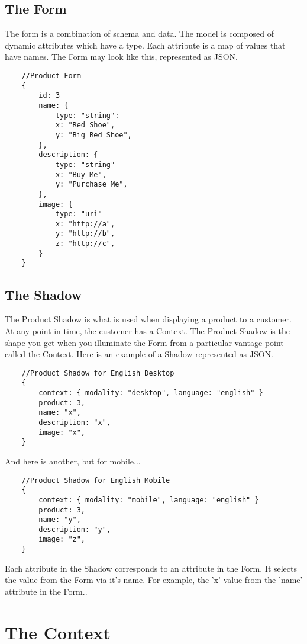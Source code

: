 \documentclass[11pt]{article}
\begin{document}
\newpage
\subsection{The Form}
The form is a combination of schema and data. The model is composed of dynamic
attributes which have a type. Each attribute is a map of values that have names.
The Form may look like this, represented as JSON.

\begin{lstlisting}
    //Product Form
    {
        id: 3
        name: { 
            type: "string": 
            x: "Red Shoe", 
            y: "Big Red Shoe", 
        },
        description: { 
            type: "string"
            x: "Buy Me", 
            y: "Purchase Me", 
        },
        image: { 
            type: "uri"
            x: "http://a", 
            y: "http://b", 
            z: "http://c",  
        } 
    }
\end{lstlisting}


\newpage
\subsection{The Shadow}
The Product Shadow is what is used when displaying a product to a customer.
At any point in time, the customer has a Context. The Product Shadow is the shape 
you get when you illuminate the Form from a particular vantage point called the Context.  
Here is an example of a Shadow represented as JSON.

\begin{lstlisting}
    //Product Shadow for English Desktop
    {
        context: { modality: "desktop", language: "english" }
        product: 3,
        name: "x",
        description: "x",
        image: "x",
    }
\end{lstlisting}

And here is another, but for mobile...

\begin{lstlisting}
    //Product Shadow for English Mobile
    {
        context: { modality: "mobile", language: "english" }
        product: 3,
        name: "y",
        description: "y",
        image: "z",
    }
\end{lstlisting}

Each attribute in the Shadow corresponds to an attribute in the Form. It selects
the value from the Form via it's name. For example, the 'x' value from the 'name' 
attribute in the Form..

\section{The Context}
\end{document}
